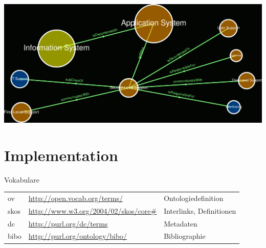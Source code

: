 \documentclass[14pt,aspectratio=1610]{beamer}
\begin{document}
\begin{frame}{}
\centering\includegraphics[width=1.05\textwidth,height=1.05\textheight,keepaspectratio]{img/spiderworm.png}
\end{frame}


\section{Implementation}

\begin{frame}{Vokabulare}
\small
\begin{tabular}{lll}
ov		&\url{http://open.vocab.org/terms/}		&Ontologiedefinition\\
skos		&\url{http://www.w3.org/2004/02/skos/core\#}	&Interlinks, Definitionen\\
dc		&\url{http://purl.org/dc/terms}			&Metadaten\\
bibo		&\url{http://purl.org/ontology/bibo/}		&Bibliographie\\
\end{tabular}
\end{frame}
\end{document}
